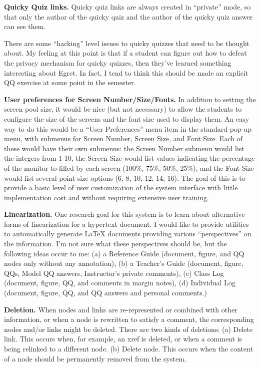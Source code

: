 \begin{itemizenoindent}
\item {\bf Quicky Quiz links.} Quicky quiz links are always created in
  ``private'' mode, so that only the author of the quicky quiz and the author
  of the quicky quiz answer can see them.  
  
  There are some ``hacking'' level issues to quicky quizzes that need to
  be thought about.  My feeling at this point is that if a student can
  figure out how to defeat the privacy mechanism for quicky quizzes, then
  they've learned something interesting about Egret.  In fact, I tend to
  think this should be made an explicit QQ exercise at some point in the
  semester.
  
\item {\bf User preferences for Screen Number/Size/Fonts.} In
  addition to setting the screen pool size, it would be nice (but not
  necessary) to allow the students to configure the size of the screens and
  the font size used to display them.  An easy way to do this would be a
  ``User Preferences'' menu item in the standard pop-up menu, with submenus
  for Screen Number, Screen Size, and Font Size.  Each of these would have
  their own submenus: the Screen Number submenu would list the integers from
  1-10, the Screen Size would list values indicating the percentage of the
  monitor to filled by each screen (100\%, 75\%, 50\%, 25\%), and the Font
  Size would list several point size options (6, 8, 10, 12, 14, 16).  The
  goal of this is to provide a basic level of user customization of the
  system interface with little implementation cost and without requiring
  extensive user training.
  
\item {\bf Linearization.} One research goal for this system is to learn
  about alternative forms of linearization for a hypertext document.  I would
  like to provide utilities to automatically generate LaTeX documents
  providing various ``perspectives'' on the information.  I'm not sure what
  these perspectives should be, but the following ideas occur to me: (a) a
  Reference Guide (document, figure, and QQ nodes only without any
  annotation), (b) a Teacher's Guide (document, figure, QQs, Model QQ
  answers, Instructor's private comments), (c) Class Log (document, figure,
  QQ, and comments in margin notes), (d) Individual Log (document, figure,
  QQ, and QQ answers and personal comments.)
  
\item {\bf Deletion.} When nodes and links are re-represented or combined
  with other information, or when a node is rewritten to satisfy a comment,
  the corresponding nodes and/or links might be deleted.  There are two kinds
  of deletions: (a) Delete link.  This occurs when, for example, an xref is
  deleted, or when a comment is being relinked to a different node.  (b)
  Delete node.  This occurs when the content of a node should be permanently
  removed from the system.


\end{itemizenoindent}
